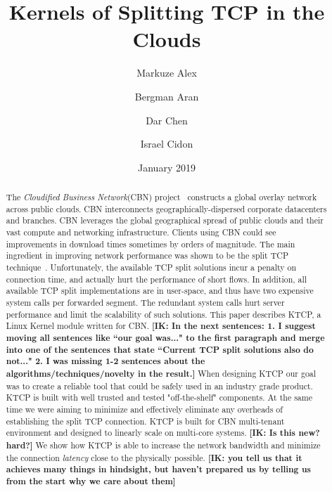 \documentclass[newfonts=false,format=sigconf,10pt,letterpaper]{acmart}
\title{Kernels of Splitting TCP in the Clouds}
\author{Markuze Alex}
\affiliation{%
  \institution{VMware Research}
  \country{Israel}
}
\author{Bergman Aran}
\affiliation{%
  \institution{VMware Research}
  \country{Israel}
}
\author{Dar Chen}
\affiliation{%
  \institution{VMware Research}
  \country{Israel}
}
\author{Israel Cidon}
\affiliation{%
  \institution{VMware Research}
  \country{Palo Alto}
}
\date{January 2019}
\newcommand{\oursys}{KTCP\xspace}
\newcommand{\mycomm}[3]{{\footnotesize{{\color{#2} \textbf{[#1: #3]}}}}}
\newcommand{\IK}[1]{\mycomm{IK}{blue}{#1}}
\begin{document}
\begin{abstract}
The \emph{Cloudified Business Network}(CBN) project~\cite{Elastic, CDD} constructs a global overlay network across public clouds. CBN interconnects geographically-dispersed corporate datacenters and branches. CBN leverages the global geographical spread of public clouds and their vast compute and networking infrastructure.
Clients using CBN could see improvements in download times sometimes by orders of magnitude. The main ingredient in improving network performance was shown to be the split TCP technique~\cite{CDD, }. 
Unfortunately, the available TCP split solutions incur a penalty on connection time, and actually hurt the performance of short flows. In addition, all available TCP split implementations are in user-space, and thus have two expensive system calls per forwarded segment. The redundant system calls hurt server performance and limit the scalability of such solutions.
\newline
This paper describes \oursys, a Linux Kernel module written for CBN. \IK{In the next sentences: 1. I suggest moving all sentences like ``our goal was..." to the first paragraph and merge into one of the sentences that state ``Current TCP split solutions also do not..." 2. I was missing 1-2 sentences about the algorithms/techniques/novelty in the result.} When designing \oursys our goal was to create a reliable tool that could be safely used in an industry grade product.  \oursys is built with well trusted and tested "off-the-shelf" components. At the same time we were aiming to  minimize and effectively eliminate any overheads of establishing the split TCP connection. \oursys is built for CBN multi-tenant environment and designed to linearly scale on multi-core systems. \IK{Is this new? hard?} We show how \oursys is able to increase the network bandwidth and minimize the connection \emph{latency} close to the physically possible. \IK{you tell us that it achieves many things in hindsight, but haven't prepared us by telling us from the start why we care about them}

\end{abstract}

\maketitle








\end{document}
